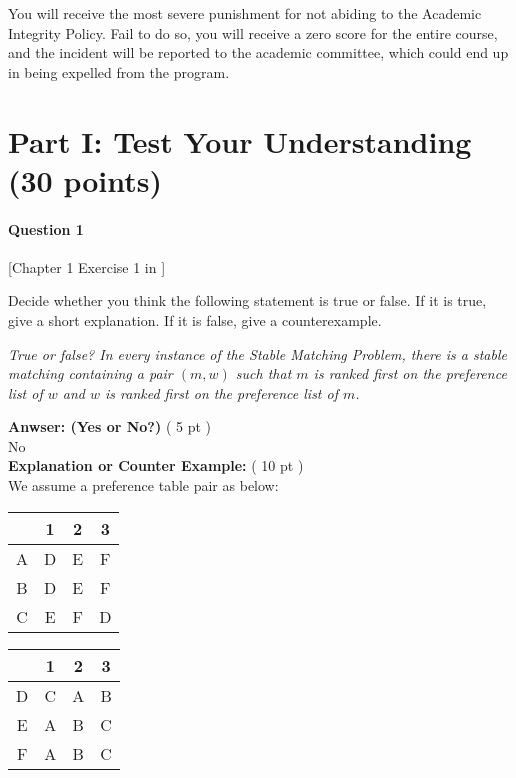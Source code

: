 You will receive the most severe punishment for not abiding to the Academic Integrity Policy. Fail to do so, you will receive a zero score for the entire course, and the incident will be reported to the academic committee, which could end up in being expelled from the program. 


\pagebreak

\section*{Part I: Test Your Understanding  (30 points)}


    \paragraph*{Question 1} [Chapter 1 Exercise 1 in \cite{KT05}]
    
    Decide whether you think the following statement is true or false. If it is true, give a short explanation. If it is false, give a counterexample.  

    \medskip
    
    \emph{True or false? In every instance of the Stable Matching Problem, there is a stable matching containing a pair $(m, w)$ such that $m$ is ranked first on the  preference list of $w$ and $w$ is ranked first on the preference list of $m$.}

    \medskip
    
    \noindent
    {\bf Anwser: (Yes or No?)} ( 5 pt )\\
        No\\
    {\bf Explanation or Counter Example:} ( 10 pt )\\
        We assume a preference table pair as below:
        \begin{center}
        \begin{tabular}{ |c|c|c|c| }
         \hline
          & 1 & 2 & 3 \\
         \hline 
         A & D & E & F \\ 
         \hline
         B & D & E & F \\  
         \hline
         C & E & F & D \\
         \hline
        \end{tabular}
        \end{center}

        \begin{center}
        \begin{tabular}{ |c|c|c|c| }
         \hline
          & 1 & 2 & 3 \\
         \hline 
         D & C & A & B \\ 
         \hline
         E & A & B & C \\  
         \hline
         F & A & B & C \\
         \hline
        \end{tabular}
        \end{center}

